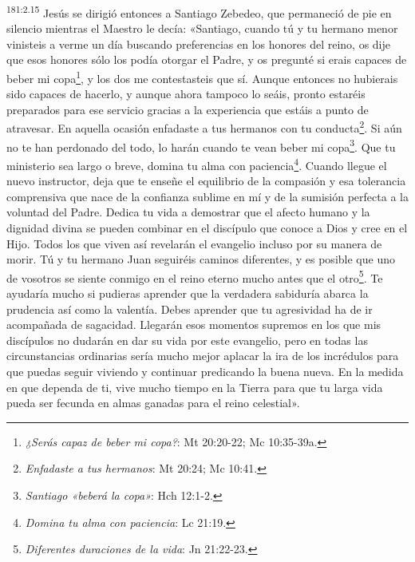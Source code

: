 \par
\textsuperscript{181:2.15} Jesús se dirigió entonces a Santiago Zebedeo, que permaneció de pie en silencio mientras el Maestro le decía: «Santiago, cuando tú y tu hermano menor vinisteis a verme un día buscando preferencias en los honores del reino, os dije que esos honores sólo los podía otorgar el Padre, y os pregunté si erais capaces de beber mi copa\footnote{\textit{¿Serás capaz de beber mi copa?}: Mt 20:20-22; Mc 10:35-39a.}, y los dos me contestasteis que sí. Aunque entonces no hubierais sido capaces de hacerlo, y aunque ahora tampoco lo seáis, pronto estaréis preparados para ese servicio gracias a la experiencia que estáis a punto de atravesar. En aquella ocasión enfadaste a tus hermanos con tu conducta\footnote{\textit{Enfadaste a tus hermanos}: Mt 20:24; Mc 10:41.}. Si aún no te han perdonado del todo, lo harán cuando te vean beber mi copa\footnote{\textit{Santiago «beberá la copa»}: Hch 12:1-2.}. Que tu ministerio sea largo o breve, domina tu alma con paciencia\footnote{\textit{Domina tu alma con paciencia}: Lc 21:19.}. Cuando llegue el nuevo instructor, deja que te enseñe el equilibrio de la compasión y esa tolerancia comprensiva que nace de la confianza sublime en mí y de la sumisión perfecta a la voluntad del Padre. Dedica tu vida a demostrar que el afecto humano y la dignidad divina se pueden combinar en el discípulo que conoce a Dios y cree en el Hijo. Todos los que viven así revelarán el evangelio incluso por su manera de morir. Tú y tu hermano Juan seguiréis caminos diferentes, y es posible que uno de vosotros se siente conmigo en el reino eterno mucho antes que el otro\footnote{\textit{Diferentes duraciones de la vida}: Jn 21:22-23.}. Te ayudaría mucho si pudieras aprender que la verdadera sabiduría abarca la prudencia así como la valentía. Debes aprender que tu agresividad ha de ir acompañada de sagacidad. Llegarán esos momentos supremos en los que mis discípulos no dudarán en dar su vida por este evangelio, pero en todas las circunstancias ordinarias sería mucho mejor aplacar la ira de los incrédulos para que puedas seguir viviendo y continuar predicando la buena nueva. En la medida en que dependa de ti, vive mucho tiempo en la Tierra para que tu larga vida pueda ser fecunda en almas ganadas para el reino celestial».

